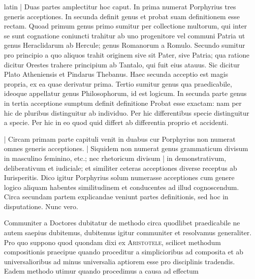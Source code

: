 \begin{otherlanguage*}{latin}
\pstart
\noindent%
\textnormal{|} Duas partes amplectitur hoc caput. In prima numerat Porphyrius tres generis acceptiones. In secunda definit genus et probat suam definitionem esse rectam. Quoad primum genus primo sumitur per collectione multorum, qui inter se sunt cognatione coniuncti trahitur ab uno progenitore vel communi Patria ut genus Heraclidarum ab Hercule; genus Romanorum a Romulo. Secundo sumitur pro principio a quo aliquos trahit originem sive sit Pater, sive Patria; qua ratione dicitur Orestes trahere principium ab Tantalo, qui fuit eius atauus. Sic dicitur Plato Atheniensis et Pindarus Thebanus. Haec secunda acceptio est magis propria, ex ea quae derivatur prima. Tertio sumitur genus qua praedicabile, ideoque appellatur genus Philosophorum, id est logicum. In secunda parte genus in tertia acceptione sumptum definit definitione  Probat esse exactam:
nam per hic de pluribus distinguitur ab individuo. Per hic differentibus specie distinguitur a specie. Per hic in eo quod quid differt ab differentia proprio et accidenti. 
\pend

\pstart
{}
\pend

\pstart
\noindent%
\textnormal{|} Circam primam parte capituli venit in duabus cur Porphyrius non numerat omnes generis acceptiones. \textnormal{|} Siquidem non numerat genus grammaticum divisum in masculino feminino, etc.; nec rhetoricum divisum \textnormal{|} in demonstrativum, deliberativum et iudiciale; et similiter ceteras acceptiones diverse receptus ab Iurisperitis. Dico igitur Porphyrius solum numerasse acceptiones cum genere logico aliquam habentes similitudinem et conducentes ad illud cognoscendum. Circa secundam partem explicandae veniunt partes definitionis, sed hoc in disputatione. Nunc vero. 
\pend

\pstart
{}
\pend

\pstart
Communiter a Doctores dubitatur de methodo circa quodlibet praedicabile ne autem saepius dubitemus, dubitemus igitur communiter et resolvamus generaliter. Pro quo suppono quod quondam dixi ex \textsc{Aristotele}, scilicet methodum compositionis praecipue quando proceditur a simplicioribus ad composita et ab universalioribus ad minus universalia aptiorem esse pro disciplinis tradendis. Eadem methodo utimur quando procedimus a causa ad effectum 
\pend


\end{otherlanguage*}
